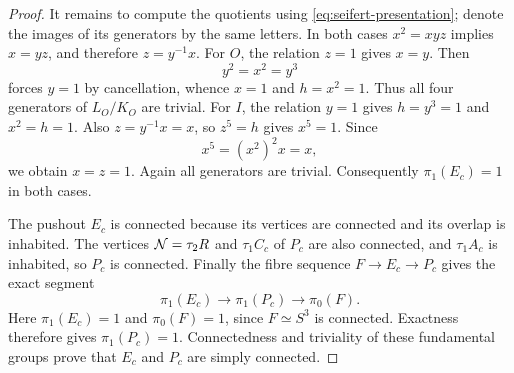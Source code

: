\begin{proof}
It remains to compute the quotients using \eqref{eq:seifert-presentation}; denote the images of its generators by the same letters. In both cases $x^2=xyz$ implies $x=yz$, and therefore $z=y^{-1}x$.
For $O$, the relation $z=1$ gives $x=y$. Then
\[
y^2=x^2=y^3
\]
forces $y=1$ by cancellation, whence $x=1$ and $h=x^2=1$. Thus all four generators of $L_O/K_O$ are trivial.
For $I$, the relation $y=1$ gives $h=y^3=1$ and $x^2=h=1$. Also $z=y^{-1}x=x$, so $z^5=h$ gives $x^5=1$. Since
\[
x^5=(x^2)^2x=x,
\]
we obtain $x=z=1$. Again all generators are trivial. Consequently $\pi_1(E_c)=1$ in both cases.

The pushout $E_c$ is connected because its vertices are connected and its overlap is inhabited. The vertices $\mathcal N=\tau_2R$ and $\tau_1C_c$ of $P_c$ are also connected, and $\tau_1A_c$ is inhabited, so $P_c$ is connected. Finally the fibre sequence $F\to E_c\to P_c$ gives the exact segment
\[
\pi_1(E_c)\longrightarrow\pi_1(P_c)\longrightarrow\pi_0(F).
\]
Here $\pi_1(E_c)=1$ and $\pi_0(F)=1$, since $F\simeq S^3$ is connected. Exactness therefore gives $\pi_1(P_c)=1$. Connectedness and triviality of these fundamental groups prove that $E_c$ and $P_c$ are simply connected.
\end{proof}

